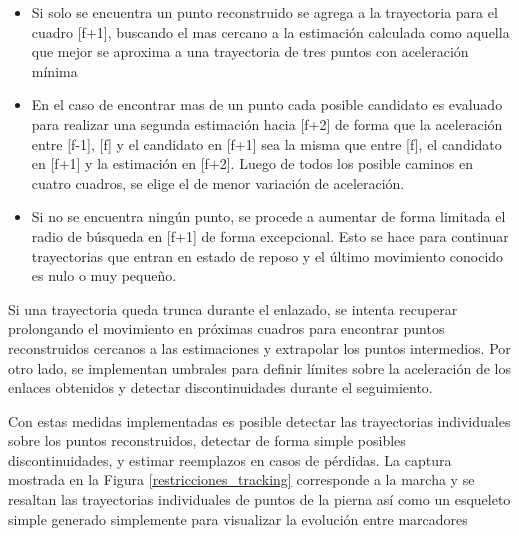 \begin{itemize}

\item Si solo se encuentra un punto reconstruido se agrega a la trayectoria para el cuadro [f+1], buscando el mas cercano a la estimación calculada como aquella que mejor se aproxima a una trayectoria de tres puntos con aceleración mínima

\item En el caso de encontrar mas de un punto cada posible candidato es evaluado para realizar una segunda estimación hacia [f+2] de forma que la aceleración entre [f-1], [f] y el candidato en [f+1] sea la misma que entre [f], el candidato en [f+1] y la estimación en [f+2]. Luego de todos los posible caminos en cuatro cuadros, se elige el de menor variación de aceleración.

\item Si no se encuentra ningún punto, se procede a aumentar de forma limitada el radio de búsqueda en [f+1] de forma excepcional. Esto se hace para continuar trayectorias que entran en estado de reposo y el último movimiento conocido es nulo o muy pequeño.

\end{itemize}

Si una trayectoria queda trunca durante el enlazado, se intenta recuperar prolongando el movimiento en próximas cuadros para encontrar puntos reconstruidos cercanos a las estimaciones y extrapolar los puntos intermedios. Por otro lado, se implementan umbrales para definir límites sobre la aceleración de los enlaces obtenidos y detectar discontinuidades durante el seguimiento.

Con estas medidas implementadas es posible detectar las trayectorias individuales sobre los puntos reconstruidos, detectar de forma simple posibles discontinuidades, y estimar reemplazos en casos de pérdidas. La captura mostrada en la Figura \ref{restricciones_tracking} corresponde a la marcha y se resaltan las trayectorias individuales de puntos de la pierna así como un esqueleto simple generado simplemente para visualizar la evolución entre marcadores


